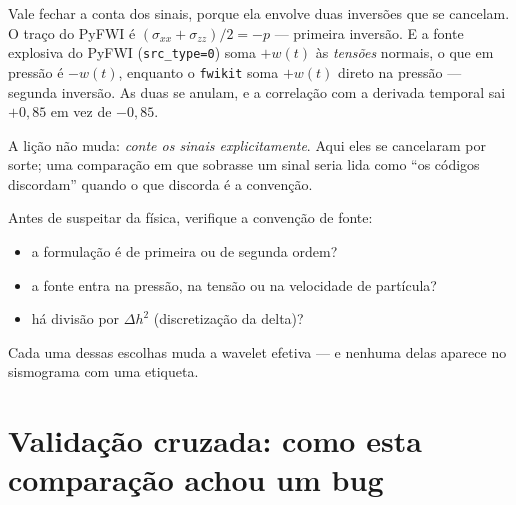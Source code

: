 \documentclass[11pt,a4paper,oneside]{report}
\newcommand{\arq}[1]{\texttt{\small #1}}
\begin{document}
\begin{atencao}
Vale fechar a conta dos sinais, porque ela envolve duas inversões que se
cancelam. O traço do PyFWI é $(\sigma_{xx}+\sigma_{zz})/2 = -p$ --- primeira
inversão. E a fonte explosiva do PyFWI (\texttt{src\_type=0}) soma
$+w(t)$ às \emph{tensões} normais, o que em pressão é $-w(t)$, enquanto o
\arq{fwikit} soma $+w(t)$ direto na pressão --- segunda inversão. As duas se
anulam, e a correlação com a derivada temporal sai $+0{,}85$ em vez de
$-0{,}85$.

A lição não muda: \emph{conte os sinais explicitamente}. Aqui eles se
cancelaram por sorte; uma comparação em que sobrasse um sinal seria lida como
``os códigos discordam'' quando o que discorda é a convenção.
\end{atencao}

\begin{pratica}
Antes de suspeitar da física, verifique a convenção de fonte:
\begin{itemize}[leftmargin=*]
\item a formulação é de primeira ou de segunda ordem?
\item a fonte entra na pressão, na tensão ou na velocidade de partícula?
\item há divisão por $\Delta h^{2}$ (discretização da delta)?
\end{itemize}
Cada uma dessas escolhas muda a wavelet efetiva --- e nenhuma delas aparece no
sismograma com uma etiqueta.
\end{pratica}

\section{Validação cruzada: como esta comparação achou um bug}
\label{sec:validacao}
\end{document}
